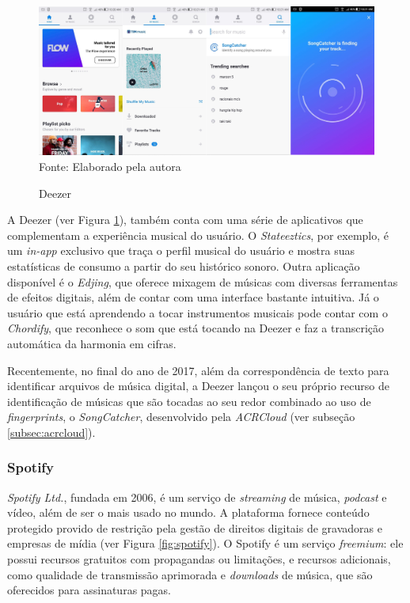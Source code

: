 \begin{figure}[!htb]
   \centering
   \caption{Deezer}\label{fig:deezer} 
   \includegraphics[scale=0.1]{figuras/deezer.jpg}
   \\Fonte: Elaborado pela autora
\end{figure}

A Deezer (ver Figura \ref{fig:deezer}), também conta com uma série de aplicativos que complementam a experiência musical do usuário. O \textit{Stateeztics}, por exemplo, é um \textit{in-app} exclusivo que traça o perfil musical do usuário e mostra suas estatísticas de consumo a partir do seu histórico sonoro. Outra aplicação disponível é o \textit{Edjing}, que oferece mixagem de músicas com diversas ferramentas de efeitos digitais, além de contar com uma interface bastante intuitiva. Já o usuário que está aprendendo a tocar instrumentos musicais pode contar com o \textit{Chordify}, que reconhece o som que está tocando na Deezer e faz a transcrição automática da harmonia em cifras.

Recentemente, no final do ano de 2017, além da correspondência de texto para identificar arquivos de música digital, a Deezer lançou o seu próprio recurso de identificação de músicas que são tocadas ao seu redor combinado ao uso de \textit{fingerprints}, o \textit{SongCatcher}, desenvolvido pela \textit{ACRCloud} (ver subseção \ref{subsec:acrcloud}).

\subsubsection{Spotify} \label{subsec:spotify}
\textit{Spotify Ltd.}, fundada em 2006, é um serviço de \textit{streaming} de música, \textit{podcast} e vídeo, além de ser o mais usado no mundo. A plataforma fornece conteúdo protegido provido de restrição pela gestão de direitos digitais de gravadoras e empresas de mídia (ver Figura \ref{fig:spotify}). O Spotify é um serviço \textit{freemium}: ele possui recursos gratuitos com propagandas ou limitações, e recursos adicionais, como qualidade de transmissão aprimorada e \textit{downloads} de música, que são oferecidos para assinaturas pagas.

